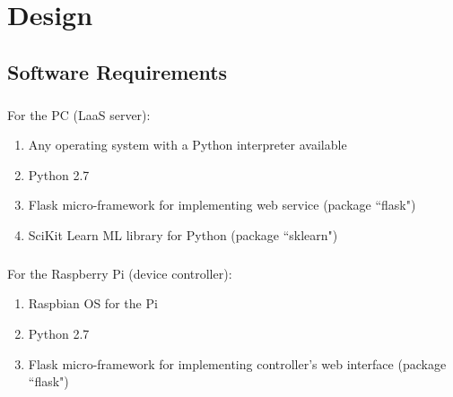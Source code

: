 \chapter{Design}


\section{Software Requirements}
\paragraph{}
For the PC (LaaS server):
\begin{enumerate}
\item Any operating system with a Python interpreter available
\item Python 2.7
\item Flask micro-framework for implementing web service (package ``flask")
\item SciKit Learn ML library for Python (package ``sklearn")
\end{enumerate}

\paragraph{}
For the Raspberry Pi (device controller):
\begin{enumerate}
\item Raspbian OS for the Pi
\item Python 2.7
\item Flask micro-framework for implementing controller's web interface (package ``flask")
\end{enumerate}

